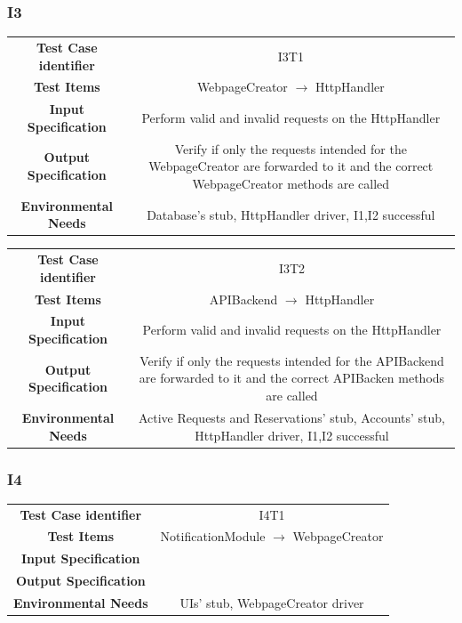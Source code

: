 \documentclass{article}
\begin{document}
\subsubsection{I3}
\begin{adjustbox}{width=1.2\textwidth}	
	\begin{tabular}{*{2}{c}}
		\toprule
		\textbf{Test Case identifier} & I3T1\\
		\textbf{Test Items} & WebpageCreator $\rightarrow$ HttpHandler\\
		\textbf{Input Specification} & Perform valid and invalid requests on the HttpHandler\\
		\textbf{Output Specification} & Verify if only the requests intended for
		the WebpageCreator are forwarded to it and the correct WebpageCreator methods are called\\
		\textbf{Environmental Needs} & Database's stub, HttpHandler driver, I1,I2 successful\\
		\bottomrule
	\end{tabular}
\end{adjustbox}
\begin{adjustbox}{width=1.2\textwidth}	
	\begin{tabular}{*{2}{c}}
		\toprule
		\textbf{Test Case identifier} & I3T2\\
		\textbf{Test Items} & APIBackend $\rightarrow$ HttpHandler\\
		\textbf{Input Specification} & Perform valid and invalid requests on the HttpHandler\\
		\textbf{Output Specification} & Verify if only the requests intended for
		the APIBackend are forwarded to it and the correct APIBacken methods are called\\
		\textbf{Environmental Needs} & Active Requests and Reservations' stub, Accounts' stub, HttpHandler driver, I1,I2 successful\\
		\bottomrule
	\end{tabular}
\end{adjustbox}
\subsubsection{I4}
\begin{adjustbox}{width=1.2\textwidth}	
	\begin{tabular}{*{2}{c}}
		\toprule
		\textbf{Test Case identifier} & I4T1\\
		\textbf{Test Items} & NotificationModule $\rightarrow$ WebpageCreator\\
		\textbf{Input Specification} & \\ %
		\textbf{Output Specification} & \\%
		\textbf{Environmental Needs} & UIs' stub, WebpageCreator driver\\
		\bottomrule
	\end{tabular}
\end{adjustbox}
\end{document}
